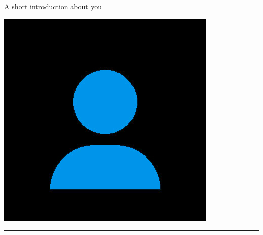 \documentclass[11pt]{anirudhcv}
\begin{document}
\vspace{0.5cm}


\hfill{}
\begin{minipage}[t]{0.75\textwidth} %
	\vspace{-\baselineskip} %
	
	A short introduction about you
\end{minipage}\hfill
\begin{minipage}[t]{0.195\textwidth} %
	\vspace{-\baselineskip} %
	\includegraphics[width=0.9\linewidth]{profile}
\end{minipage}

\noindent\color{black}\rule{0.81\paperwidth}{0.5ex}
\newline
{}\hfill{}
\end{document}
